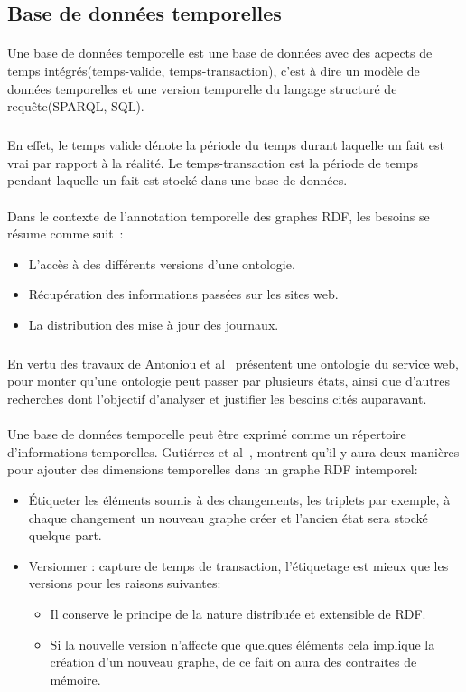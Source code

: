 \subsection*{Base de données temporelles}
\paragraph{}
Une base de données temporelle est une base de données avec des acpects de temps intégrés(temps-valide, temps-transaction), c'est à dire un modèle de données temporelles et une version temporelle du langage structuré de requête(SPARQL, SQL).
\subparagraph{}
En effet, le temps valide dénote la période du temps durant laquelle un fait est vrai par rapport à la réalité.
Le temps-transaction est la période de temps pendant laquelle un fait est stocké dans une base de données.
\paragraph{}
Dans le contexte de l'annotation temporelle des graphes RDF, les besoins se résume comme suit~:
\begin{itemize}
\item L'accès à des différents versions d’une ontologie.
\item Récupération des informations passées sur les sites web.
\item La distribution des mise à jour des journaux.
\end{itemize}
\subparagraph{}
En vertu des travaux de Antoniou et al~\cite{antoniou2004} présentent une ontologie du service web, pour monter qu'une ontologie peut passer par plusieurs états, ainsi que d'autres recherches dont l'objectif d'analyser et justifier les besoins cités auparavant.
\paragraph{}
Une base de données temporelle peut être exprimé comme un répertoire d'informations temporelles.
Gutiérrez et al~\cite{gutierrez2007}, montrent qu'il y aura deux manières pour ajouter des dimensions temporelles dans un graphe RDF intemporel:
\begin{itemize}
\item Étiqueter les éléments soumis à des changements, les triplets par exemple, à chaque changement un nouveau graphe créer et l’ancien état sera stocké quelque part.
\item Versionner : capture de temps de transaction, l’étiquetage est mieux que les versions pour les raisons suivantes: 
 \begin{itemize}
\item Il conserve le principe de la nature distribuée et extensible de RDF.
\item Si la nouvelle version n’affecte que quelques éléments cela implique la création d’un nouveau graphe, de ce fait on aura des contraites de mémoire.
\end{itemize}
\end{itemize}
